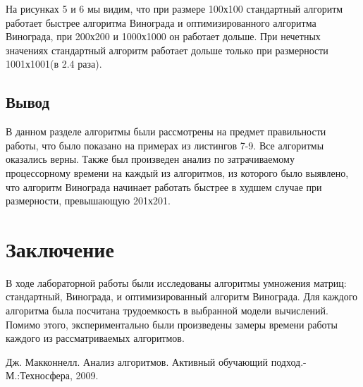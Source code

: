 \documentclass[a4paper, 14pt]{article}
\begin{document}
       	
    На рисунках 5 и 6 мы видим, что при размере 100х100 стандартный алгоритм работает быстрее алгоритма Винограда и оптимизированного алгоритма Винограда, при 200х200 и 1000х1000 он работает дольше. При нечетных значениях стандартный алгоритм работает дольше только при размерности 1001х1001(в 2.4 раза). 
	\subsection{Вывод}
	В данном разделе алгоритмы были рассмотрены на предмет правильности работы, что было показано на примерах из листингов 7-9. Все алгоритмы оказались верны. Также был произведен анализ по затрачиваемому процессорному времени на каждый из алгоритмов, из которого было выявлено, что алгоритм Винограда начинает работать быстрее в худшем случае при размерности, превышающую 201х201.
		

    	\newpage
        \section*{Заключение}
        
        В ходе лабораторной работы были исследованы алгоритмы умножения матриц: стандартный, Винограда, и оптимизированный алгоритм Винограда. Для каждого алгоритма была посчитана трудоемкость в выбранной модели вычислений. Помимо этого, экспериментально были произведены замеры времени работы каждого из рассматриваемых алгоритмов. 
        


    \begin{center}
    	\newpage
        
        \begin{thebibliography}{}
      Дж. Макконнелл. Анализ алгоритмов. Активный обучающий подход.-М.:Техносфера, 2009.
\end{thebibliography}
	
	
	
	
        
    \end{center}        
\end{document}
